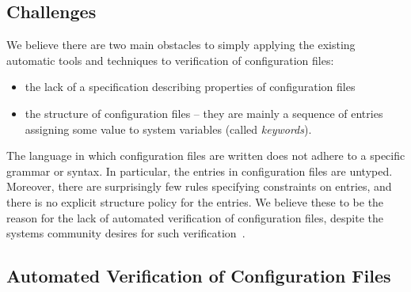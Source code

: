\subsection{Challenges}
\label{sec:intro-chal}

We believe there are two main obstacles 
to simply applying the existing automatic 
tools and techniques to verification of configuration files:
\begin{itemize}
\item the lack
of a specification describing properties of configuration files
\item the structure of configuration files -- they
are mainly a sequence of entries assigning some value to system
variables (called {\emph {keywords}}). 
\end{itemize}
The language in which configuration files are written does 
not adhere to a specific grammar or syntax. In particular, the
entries in configuration files are untyped. Moreover, there are surprisingly few rules specifying constraints on entries, and there
is no explicit structure policy for the entries.
We believe these to be the reason for the %
lack of automated verification of configuration 
files,%
despite the systems community desires for such verification~\cite{wang04automatic, zhang14encore, xu15systems}.


\subsection{Automated Verification of Configuration Files}
\label{sec:intro-goal}

